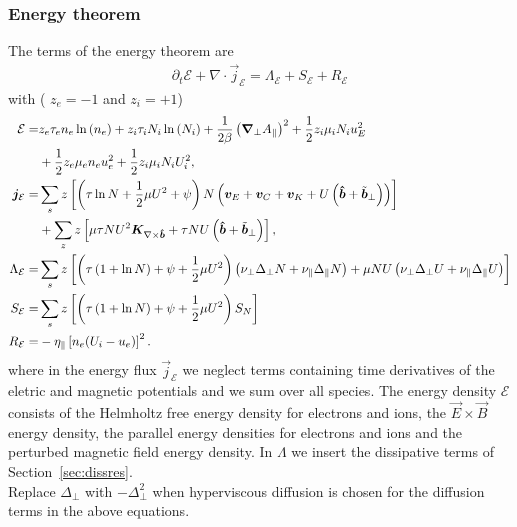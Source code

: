 \subsubsection{Energy theorem}
The terms of the energy theorem are
\begin{align} \label{eq:energy_theorem}
\partial_t \mathcal E +
\nabla \cdot \vec j_{\mathcal E}
= \Lambda_{\mathcal E}
+  S_{\mathcal E}
+  R_{\mathcal E}
\end{align}
with ( $z_e=-1$ and $z_i=+1$)
\begin{align} \label{eq:energy_conservation}
  \mathcal{E}= & z_e\tau_e n_e \ln{(n_e)} +z_i\tau_i N_i\ln{(N_i)}
  +\frac{1}{2\beta}\left({\boldsymbol{\nabla}}_\perp A_\parallel\right)^2
   +  \frac{1}{2} z_i \mu_i N_i u_E^2  \nonumber\\
   & +\frac{1}{2} z_e\mu_e  n_e u_e^2
  +\frac{1}{2} z_i\mu_i  N_i U_i^2,\\
  {\boldsymbol{j}}_{\mathcal E} =& \sum_s z\left[
  \left(\tau \ln N + \frac{1}{2}\mu U^2 + \psi \right)N\left(
  {\boldsymbol{v}}_E + {\boldsymbol{v}}_C + {\boldsymbol{v}}_{K} +U\left(\bm{\hat{b}}+\tilde{{\boldsymbol{b}}}_\perp\right)  \right) \right]
  \nonumber\\
  &+ \sum_z z\left[\mu \tau NU^2{\boldsymbol{K}}_{\nabla\times\bm{\hat{b}}} + \tau NU \left(\bm{\hat{b}} + \tilde{{\boldsymbol{b}}}_\perp\right)\right], \\
  \Lambda_{\mathcal E} =&  \sum_s z\left[\left( \tau\left( 1+\ln{N}\right) + \psi + \frac{1}{2} \mu U^2 \right)
  \left(\nu_\perp\Delta_\perp N + \nu_\parallel\Delta_\parallel N\right)  +  \mu NU\left(\nu_\perp\Delta_\perp U + \nu_\parallel\Delta_\parallel U\right) \right]
\nonumber \\
  S_{\mathcal E} =&  \sum_s  z\left[ \left(\tau\left( 1+\ln{N}\right) +\psi + \frac{1}{2} \mu U^2 \right)S_{N}\right]
\nonumber \\
  R_{\mathcal E} =&  -\eta_\parallel  \left[ n_e(U_i-u_e)\right]^2.
\end{align}
where in the energy flux $\vec j_{\mathcal E}$
we neglect terms  containing time derivatives
of the eletric and magnetic potentials and we sum over all species.
The energy density $\mathcal E$ consists of the Helmholtz free energy density for electrons and ions,
the \(\vec{E} \times \vec{B}\) energy density, the parallel energy densities for electrons and ions and the perturbed magnetic field energy density.
In \(\Lambda\) we insert the dissipative terms of Section~\ref{sec:dissres}. \\
Replace $\Delta_\perp$ with $-\Delta_\perp^2$ when hyperviscous diffusion is chosen
for the diffusion terms in the above equations.

